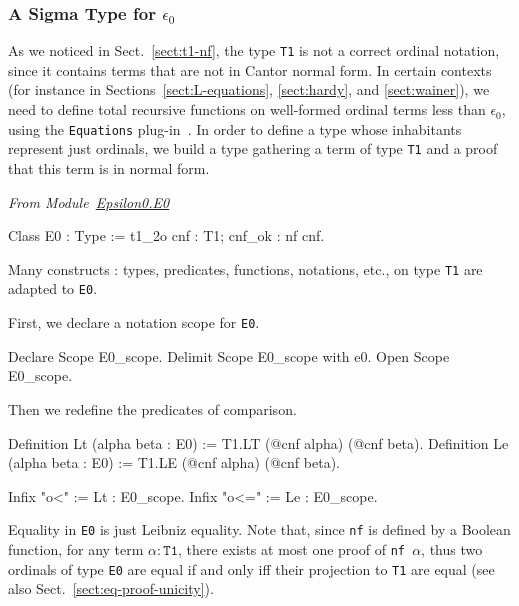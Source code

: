   
\subsubsection{A Sigma Type for \texorpdfstring{$\epsilon_0$}{epsilon0}}

As we noticed in Sect.~\ref{sect:t1-nf}, the type \texttt{T1} is not a correct ordinal notation, since it contains terms that are not in Cantor normal form. In certain contexts (for instance in Sections~\ref{sect:L-equations}, \ref{sect:hardy},
and \ref{sect:wainer}),  we need to define total recursive functions on well-formed ordinal terms less  than $\epsilon_0$, using the \texttt{Equations} plug-in~\cite{sozeau:hal-01671777}.
 In order to define a type whose inhabitants represent just ordinals, we build a type gathering a term of type \texttt{T1} and a proof that this term is in normal form.
 

\label{sect:E0-def}
\label{types:E0}

\emph{From Module~\href{../theories/html/hydras.Epsilon0.E0.html}{Epsilon0.E0}}



\begin{Coqsrc}
Class E0 : Type := t1_2o {cnf : T1; cnf_ok : nf cnf}.
\end{Coqsrc}

Many constructs : types, predicates, functions, notations, etc., on type \texttt{T1} are adapted to \texttt{E0}.

First, we declare a notation scope for \texttt{E0}.

\begin{Coqsrc}
Declare Scope E0_scope.
Delimit Scope E0_scope with e0.
Open Scope E0_scope.
\end{Coqsrc}

Then we redefine the predicates of comparison.

\label{Predicates:Lt-E0}

\begin{Coqsrc}
Definition Lt (alpha beta : E0) := T1.LT (@cnf alpha) (@cnf beta).
Definition Le (alpha beta : E0) := T1.LE (@cnf alpha) (@cnf beta).

Infix "o<" := Lt : E0_scope.
Infix "o<=" := Le : E0_scope.
\end{Coqsrc}
  

Equality in \texttt{E0} is just Leibniz equality. Note that, since \texttt{nf} is
defined by a Boolean function, for  any term $\alpha:\texttt{T1}$, there exists at most one proof of \texttt{nf $\alpha$}, thus two ordinals of type \texttt{E0} are
equal if and only iff their projection to \texttt{T1} are equal (see also Sect.~\vref{sect:eq-proof-unicity}).

